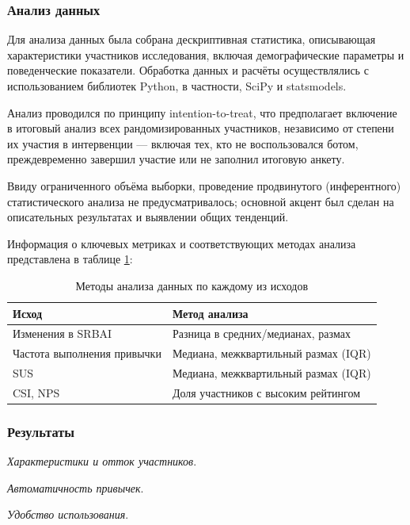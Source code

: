 \documentclass[pdflatex,sn-mathphys-num]{sn-jnl}%
\theoremstyle{thmstyleone}%
\theoremstyle{thmstyletwo}%
\theoremstyle{thmstylethree}%
\begin{document}
\subsubsection{Анализ данных}

Для анализа данных была собрана дескриптивная статистика, описывающая характеристики участников исследования, включая демографические параметры и поведенческие показатели. Обработка данных и расчёты осуществлялись с использованием библиотек Python, в частности, SciPy и statsmodels.

Анализ проводился по принципу intention-to-treat, что предполагает включение в итоговый анализ всех рандомизированных участников, независимо от степени их участия в интервенции — включая тех, кто не воспользовался ботом, преждевременно завершил участие или не заполнил итоговую анкету.

Ввиду ограниченного объёма выборки, проведение продвинутого (инферентного) статистического анализа не предусматривалось; основной акцент был сделан на описательных результатах и выявлении общих тенденций.

Информация о ключевых метриках и соответствующих методах анализа представлена в таблице \ref{tab:rct_outcomes}:

\begin{table}[h!]
\normalsize
\centering
\caption{Методы анализа данных по каждому из исходов}
\label{tab:rct_outcomes}
\begin{tabular}{|p{5cm}|p{8cm}|}
\hline
\textbf{Исход} & \textbf{Метод анализа} \\
\hline
Изменения в SRBAI & Разница в средних/медианах, размах \\
\hline
Частота выполнения привычки & Медиана, межквартильный размах (IQR) \\
\hline
SUS & Медиана, межквартильный размах (IQR) \\
\hline
CSI, NPS & Доля участников с высоким рейтингом \\
\hline
\end{tabular}
\end{table}

\subsubsection{Результаты}

\textit{Характеристики и отток участников}.

\textit{Автоматичность привычек}.

\textit{Удобство использования}.
\end{document}
